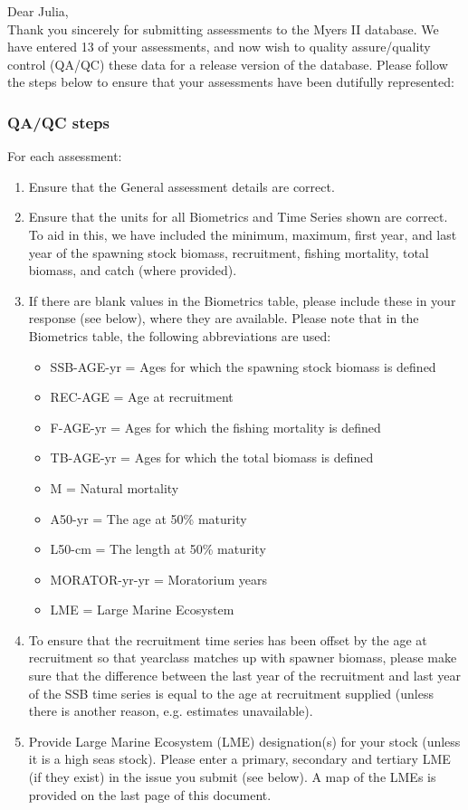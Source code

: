 \documentclass [a4paper, 10pt] {article}
\begin{document}
\noindent Dear Julia,\\

\noindent Thank you sincerely for submitting assessments to the Myers II database. We have entered 13 of your assessments, and now wish to quality assure/quality control (QA/QC) these data for a release version of the database. Please follow the steps below to ensure that your assessments have been dutifully represented:
\subsubsection{QA/QC steps}
For each assessment:
\begin{enumerate}
\item Ensure that the General assessment details are correct.
\item Ensure that the units for all Biometrics and Time Series shown are correct. To aid in this, we have included the minimum, maximum, first year, and last year of the spawning stock biomass, recruitment, fishing mortality, total biomass, and  catch  (where provided). 
\item If there are blank values in the Biometrics table, please include these in your response (see below), where they are available.
Please note that in the Biometrics table, the following abbreviations are used:
\begin{itemize}
\item SSB-AGE-yr  = Ages for which the spawning stock biomass is defined
\item REC-AGE     = Age at recruitment
\item F-AGE-yr    = Ages for which the fishing mortality is defined 
\item TB-AGE-yr   = Ages for which the total biomass is defined
\item M      = Natural mortality
\item A50-yr      = The age at 50\% maturity
\item L50-cm      = The length at 50\% maturity
\item MORATOR-yr-yr = Moratorium years
\item LME = Large Marine Ecosystem\\
\end{itemize}
\item To ensure that the recruitment time series has been offset by the age at recruitment so that yearclass matches up with spawner biomass, please make sure that the difference between the last year of the recruitment and last year of the SSB time series is equal to the age at recruitment supplied (unless there is another reason, e.g. estimates unavailable). 
\item Provide Large Marine Ecosystem (LME) designation(s) for your stock (unless it is a high seas stock). Please enter a primary, secondary and tertiary LME (if they exist) in the issue you submit (see below). A map of the LMEs is provided on the last page of this document. 
\end{enumerate}
\vspace{-.25in}
\end{document}
